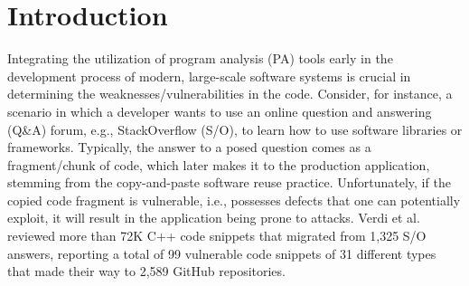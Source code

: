 \section{Introduction}
Integrating the utilization of program analysis (PA) tools early in the development process of modern, large-scale software systems is crucial in determining the weaknesses/vulnerabilities in the code. Consider, for instance, a scenario in which a developer wants to use an online question and answering (Q\&A) forum, e.g., StackOverflow (S/O), to learn how to use software libraries or frameworks. Typically, the answer to a posed question comes as a fragment/chunk of code, which later makes it to the production application, stemming from the copy-and-paste software reuse practice. Unfortunately, if the copied code fragment is vulnerable, i.e., possesses defects that one can potentially exploit, it will result in the application being prone to attacks. Verdi et al. \cite{verdi-tse22} reviewed more than 72K C++ code snippets that migrated from 1,325 S/O answers, reporting a total of 99 vulnerable code snippets of 31 different types that made their way to 2,589 GitHub repositories.

